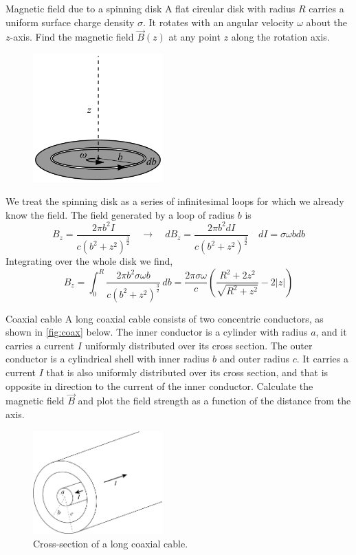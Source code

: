 \documentclass[makesolutionspdf]{esg8022pset}
\begin{document}
\begin{problem}{Magnetic field due to a spinning disk}
  A flat circular disk with radius $R$ carries a uniform surface charge density
  $\sigma$. It rotates with an angular velocity $\omega$ about the $z$-axis.
  Find the magnetic field $\vec{B}(z)$ at any point $z$ along the rotation
  axis.
  \begin{figure}[H]
    \centering
    \includegraphics[width = 5cm]{Spinningdisk}
  \end{figure}
\end{problem}

\begin{solution}
  We treat the spinning disk as a series of infinitesimal loops for which we
  already know the field. The field generated by a loop of radius $b$ is
  $$B_z = \frac{2\pi b^2 I}{c(b^2+z^2)^{\frac{3}{2}}}\quad\to\quad dB_z = \frac{2\pi b^2 dI}{c(b^2+z^2)^{\frac{3}{2}}} \quad dI = \sigma\omega bdb$$
  Integrating over the whole disk we find,
  $$B_z = \int_0^R \frac{2\pi b^2 \sigma\omega b}{c(b^2+z^2)^{\frac{3}{2}}}\,db =
  \frac{2\pi\sigma\omega}{c}\left(\frac{R^2+2z^2}{\sqrt{R^2+z^2}}-2|z|\right)
  $$
\end{solution}





\begin{problem}{Coaxial cable}
  A long coaxial cable consists of two concentric conductors, as shown in
  \autoref{fig:coax} below.  The inner conductor is a cylinder with radius $a$,
  and it carries a current $I$ uniformly distributed over its cross section.
  The outer conductor is a cylindrical shell with inner radius $b$ and outer
  radius $c$. It carries a current $I$ that is also uniformly distributed over
  its cross section, and that is opposite in direction to the current of the
  inner conductor.  Calculate the magnetic field $\vec{B}$  and plot the field
  strength as a function of the distance from the axis.
  \begin{figure}[H]
    \centering
    \includegraphics[width = 5cm]{coax}
    \caption{Cross-section of a long coaxial cable.}   
    \label{fig:coax}
  \end{figure}
\end{problem}
\end{document}

